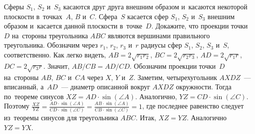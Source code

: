 %
\problem{}
Сферы $S_1$, $S_2$ и~$S_3$ касаются друг друга внешним образом и~касаются
некоторой плоскости в~точках~$A$, $B$ и~$C$.
Сфера~$S$ касается сфер $S_1$, $S_2$ и~$S_3$ внешним образом и~касается данной
плоскости в~точке~$D$.
Докажите, что проекции точки~$D$ на~стороны треугольника $ABC$ являются
вершинами правильного треугольника.
\solution
\label{2014/ru/team/senior/5:solution}%
Обозначим через $r_1$, $r_2$, $r_3$ и~$r$ радиусы сфер
$S_1$, $S_2$, $S_3$ и~$S$, соответственно.
Как легко видеть, $AB = 2 \sqrt{r_1 r_2}$, $BC = 2 \sqrt{r_2 r_3}$,
$AD = 2 \sqrt{r_1 r}$, $DC = 2 \sqrt{r_3 r}$.
Значит, $AB / CB = AD / CD$.
Обозначим проекции точки~$D$ на~стороны $AB$, $BC$ и~$CA$ через $X$, $Y$ и~$Z$.
Заметим, четырехугольник $AXDZ$~--- вписанный, а~$AD$~--- диаметр описанной
вокруг $AXDZ$ окружности.
Тогда по~теореме синусов $XZ = AD \cdot \sin(\angle A)$.
Аналогично, $YZ = CD \cdot \sin(\angle{C})$.
Поэтому
\(
    \frac{XZ}{YZ}
=
    \frac{
        AD \cdot \sin(\angle A)
    }{
        CD \cdot \sin(\angle C)
    }
=
    \frac{
        AB \cdot \sin(\angle A)
    }{
        CB \cdot \sin(\angle C)
    }
=
    1
\),
где последнее равенство следует из~теоремы синусов для треугольника $ABC$.
Итак, $XZ = YZ$.
Аналогично $YZ = YX$.
\endproblem
